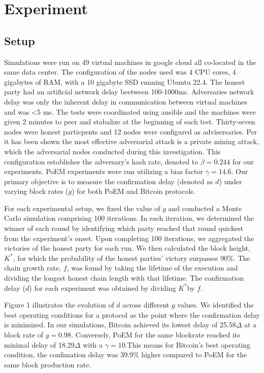 \section{Experiment}

\subsection{Setup}

Simulations were run on 49 virtual machines in google cloud all co-located in
the same data center. The configuration of the nodes used was 4 CPU cores, 4
gigabytes of RAM, with a 10 gigabyte SSD running Ubuntu 22.4. The honest party
had an artificial network delay beetween 100-1000ms. Adversaries network delay
was only the inherent delay in communication between virtual machines and was
<5 ms. The tests were coordinated using ansible and the machines were given 2
minutes to peer and stabalize at the beginning of each test. Thirty-seven nodes
were honest particpents and 12 nodes were configured as advisersaries.
Per\cite{eiar} it has been shown the most effective adversarial attack is a
private mining attack, which the adversarial nodes conducted during this
investigation. This configuration establishes the adversary's hash rate,
denoted to $\beta=0.244$ for our experiments. PoEM
experiments were run utilizing a bias factor $\gamma=14.6$. Our primary objective is
to measure the confirmation delay (denoted as $d$) under varying block rates
($g$) for both PoEM and Bitcoin protocols.

For each experimental setup, we fixed the value of $g$ and conducted a Monte
Carlo simulation comprising 100 iterations. In each iteration, we determined
the winner of each round by identifying which party reached that round quickest
from the experiment's onset. Upon completing 100 iterations, we aggregated the
victories of the honest party for each run. We then calculated the block
height, $K^*$, for which the probability of the honest parties' victory
surpasses 90\%. The chain growth rate, $f$, was found by taking the lifetime of
the execution and dividing the longest honest chain length with that lifetime.
The confirmation delay ($d$) for each experiment was obtained by dividing
$K^*$by $f$.

Figure 1 illustrates the evolution of $d$ across different $g$ values. We
identified the best operating conditions for a protocol as the point where the
confirmation delay is minimized. In our simulations, Bitcoin achieved its
lowest delay of 25.58$\Delta$ at a block rate of $g=0.98$. Conversely, PoEM for the same blockrate reached its
minimal delay of 18.29$\Delta$ with a $\gamma=10$.This means for Bitcoin's best operating condition, the confimation delay was 
39.9\% higher compared to PoEM for the same block production rate. 

